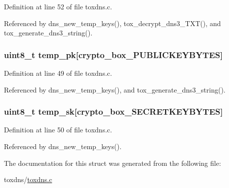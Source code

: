 Definition at line 52 of file toxdns.\+c.



Referenced by dns\+\_\+new\+\_\+temp\+\_\+keys(), tox\+\_\+decrypt\+\_\+dns3\+\_\+\+T\+X\+T(), and tox\+\_\+generate\+\_\+dns3\+\_\+string().

\hypertarget{struct_d_n_s___object_a46affbcc202b25e96fd1f5238e9e97e0}{
\subsubsection[{temp\+\_\+pk}]{\setlength{\rightskip}{0pt plus 5cm}uint8\+\_\+t temp\+\_\+pk\mbox{[}crypto\+\_\+box\+\_\+\+P\+U\+B\+L\+I\+C\+K\+E\+Y\+B\+Y\+T\+E\+S\mbox{]}}}\label{struct_d_n_s___object_a46affbcc202b25e96fd1f5238e9e97e0}


Definition at line 49 of file toxdns.\+c.



Referenced by dns\+\_\+new\+\_\+temp\+\_\+keys(), and tox\+\_\+generate\+\_\+dns3\+\_\+string().

\hypertarget{struct_d_n_s___object_a3652189f09ee098ced277788337d95e7}{
\subsubsection[{temp\+\_\+sk}]{\setlength{\rightskip}{0pt plus 5cm}uint8\+\_\+t temp\+\_\+sk\mbox{[}crypto\+\_\+box\+\_\+\+S\+E\+C\+R\+E\+T\+K\+E\+Y\+B\+Y\+T\+E\+S\mbox{]}}}\label{struct_d_n_s___object_a3652189f09ee098ced277788337d95e7}


Definition at line 50 of file toxdns.\+c.



Referenced by dns\+\_\+new\+\_\+temp\+\_\+keys().



The documentation for this struct was generated from the following file\+:\begin{DoxyCompactItemize}
\item 
toxdns/\hyperlink{toxdns_8c}{toxdns.\+c}\end{DoxyCompactItemize}
